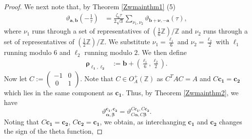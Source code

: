 \documentclass[10pt,a4paper]{amsart}
\renewcommand{\a}{\alpha}
\renewcommand{\b}{\beta}
\newcommand{\os}[2]{\overset{#1}{#2}}
\renewcommand{\pmod}[1]{\ \left( \mathrm{mod} \, #1 \right)}
\renewcommand{\t}{\tau}
\newcommand{\z}{\zeta}
\begin{document}
\begin{proof}
We next note that, by Theorem \ref{Zwmainthm1} (5)
\begin{align}\label{star}
\vartheta_{\bm{a},\bm{b}}\left(-\frac{1}{\t}\right)%
&=\frac{\z_6\t}{2\sqrt{3}}\sum_{\nu_1,\nu_2}\vartheta_{\bm{b}+\bm{\nu},-\bm{a}}(\t),
\end{align}
where $\nu_1$ runs through a set of representatives of $(\frac 16\mathbb{Z})/\mathbb{Z}$ and $\nu_2$ runs through a set of representatives of $(\frac 12\mathbb{Z})/\mathbb{Z}$. We substitute $\nu_1=\frac{\ell_1}{6}$ and $\nu_2=\frac{\ell_2}{2}$ with $\ell_1$ running modulo $6$ and $\ell_2$ running modulo $2$. We then define
\begin{align}\label{l1l2}
\bm{\rho_{\ell_1,\ell_2}}&:=\bm{b}+\left(\frac{\ell_1}{6},\frac{\ell_2}{2}\right).%
\end{align}
Now let $C:=(\begin{smallmatrix}
-1&0\\
\ 0&1
\end{smallmatrix})$. Note that  $C\in O^{+}_{A}(\mathbb{Z})$ as $C^TAC=A$ and $C\bm{c_1}=\bm{c_2}$ which lies in the same component as $\bm{c_1}$. Thus, by Theorem \ref{Zwmainthm2}, we have
\begin{equation*}
\vartheta^{\bm{c_1}, \bm{c_2}}_{\bm{\a},\bm{\b}}=\vartheta^{C\bm{c_1}, C\bm{c_2}}_{C\bm{\a},C\bm{\b}}.
\end{equation*}
Noting that $C\bm{c_1}=\bm{c_2}$, $C\bm{c_2}=\bm{c_1}$, we obtain, as interchanging $\bm{c_1}$ and $\bm{c_2}$ changes the sign of the theta function, 

\end{proof}
\end{document}
